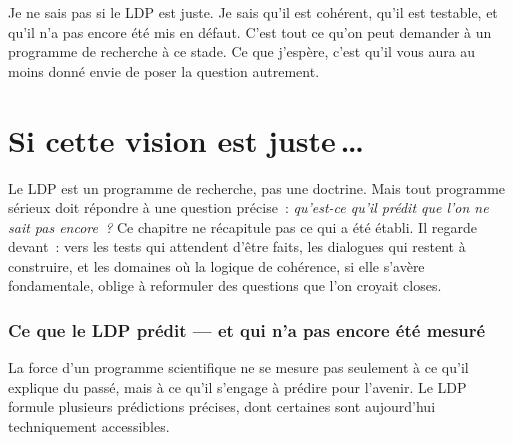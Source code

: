 \documentclass[12pt, a4paper, openright]{book}
\begin{document}
\medskip

Je ne sais pas si le LDP est juste. Je sais qu'il est cohérent, qu'il est testable, et qu'il n'a pas encore été mis en défaut. C'est tout ce qu'on peut demander à un programme de recherche à ce stade. Ce que j'espère, c'est qu'il vous aura au moins donné envie de poser la question autrement.

\chapter{Si cette vision est juste\texorpdfstring{\,\ldots}{...}}

Le LDP est un programme de recherche, pas une doctrine. Mais tout programme sérieux doit répondre à une question précise~: \emph{qu'est-ce qu'il prédit que l'on ne sait pas encore~?} Ce chapitre ne récapitule pas ce qui a été établi. Il regarde devant~: vers les tests qui attendent d'être faits, les dialogues qui restent à construire, et les domaines où la logique de cohérence, si elle s'avère fondamentale, oblige à reformuler des questions que l'on croyait closes.

\subsection*{Ce que le LDP prédit --- et qui n'a pas encore été mesuré}

La force d'un programme scientifique ne se mesure pas seulement à ce qu'il explique du passé, mais à ce qu'il s'engage à prédire pour l'avenir. Le LDP formule plusieurs prédictions précises, dont certaines sont aujourd'hui techniquement accessibles.

\medskip
\end{document}
